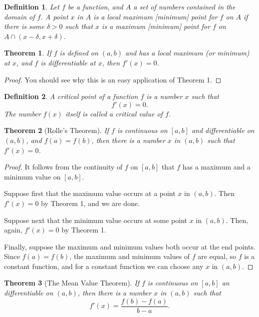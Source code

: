 \documentclass{article}
\newtheorem{definition}{Definition}
\newtheorem{theorem}{Theorem}
\begin{document}
\begin{definition}
  Let $f$ be a function, and $A$ a set of numbers contained in the domain of
  $f$. A point $x$ in $A$ is a \emph{local maximum [minimum] point} for $f$ on
  $A$ if there is some $\delta > 0$ such that $x$ is a maximum [minimum]
  point for $f$ on $A \cap (x - \delta, x + \delta)$.
\end{definition}

\begin{theorem}
  If $f$ is defined on $(a, b)$ and has a local maximum (or minimum) at $x$,
  and $f$ is differentiable at $x$, then $f'(x) = 0$.
\end{theorem}

\begin{proof}
  You should see why this is an easy application of Theorem 1.
\end{proof}

\begin{definition}
  A \emph{critical point} of a function $f$ is a number $x$ such that
  \begin{equation*}
    f'(x) = 0.
  \end{equation*} The number $f(x)$ itself is called a \emph{critical value} of
  $f$.
\end{definition}

\begin{theorem}[Rolle's Theorem]
  If $f$ is continuous on $[a, b]$ and differentiable on $(a, b)$, and $f(a) =
  f(b)$, then there is a number $x$ in $(a, b)$ such that $f'(x) = 0$.
\end{theorem}

\begin{proof}
  It follows from the continuity of $f$ on $[a, b]$ that $f$ has a maximum and
  a minimum value on $[a, b]$.

  Suppose first that the maximum value occurs at a point $x$ in $(a, b)$. Then
  $f'(x) = 0$ by Theorem 1, and we are done.

  Suppose next that the minimum value occurs at some point $x$ in $(a, b)$.
  Then, again, $f'(x) = 0$ by Theorem 1.

  Finally, suppose the maximum and minimum values both occur at the end points.
  Since $f(a) = f(b)$, the maximum and minimum values of $f$ are equal, so $f$
  is a constant function, and for a constant function we can choose any $x$ in
  $(a, b)$.
\end{proof}

\begin{theorem}[The Mean Value Theorem]
  If $f$ is continuous on $[a, b]$ an differentiable on $(a, b)$, then there is
  a number $x$ in $(a, b)$ such that \begin{equation*}
    f'(x) = \frac{f(b) - f(a)}{b - a}.
  \end{equation*}
\end{theorem}
\end{document}
